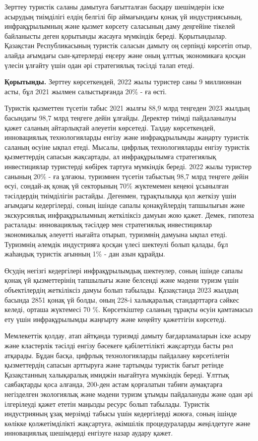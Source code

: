 \begin{multicols}{2}
Зерттеу туристік саланы дамытуға бағытталған басқару шешімдерін іске
асырудың тиімділігі елдің белгілі бір аймағындағы қонақ үй
индустриясының, инфрақұрылымның және қызмет көрсету саласының даму
деңгейіне тікелей байланысты деген қорытынды жасауға мүмкіндік береді.
Қорытындылар. Қазақстан Республикасының туристік саласын дамыту оң
серпінді көрсетіп отыр, алайда ағымдағы сын-қатерлерді еңсеру және оның
ұлттық экономикаға қосқан үлесін ұлғайту үшін одан әрі стратегиялық
тәсілді талап етеді.

{\bfseries Қорытынды.} Зерттеу көрсеткендей, 2022 жылы туристер саны 9
миллионнан асты, бұл 2021 жылмен салыстырғанда 20\% - ға өсті.

Туристік қызметтен түсетін табыс 2021 жылғы 88,9 млрд теңгеден 2023
жылдың басындағы 98,7 млрд теңгеге дейін ұлғайды. Деректер тиімді
пайдаланылуы қажет саланың айтарлықтай әлеуетін көрсетеді. Талдау
көрсеткендей, инновациялық технологияларды енгізу және инфрақұрылымды
жаңарту туристік саланың өсуіне ықпал етеді. Мысалы, цифрлық
технологияларды енгізу туристік қызметтердің сапасын жақсартады, ал
инфрақұрылымға стратегиялық инвестициялар туристерді көбірек тартуға
мүмкіндік береді. 2022 жылы туристер санының 20\% - ға ұлғаюы, туризмнен
түсетін табыстың 98,7 млрд теңгеге дейін өсуі, сондай-ақ қонақ үй
секторының 70\% жүктемемен кеңеюі ұсынылған тәсілдердің тиімділігін
растайды. Дегенмен, тұрақтылыққа қол жеткізу үшін ағымдағы кедергілерді,
соның ішінде сапалы қонақүйлердің тапшылығын және экскурсиялық
инфрақұрылымның жеткіліксіз дамуын жою қажет. Демек, гипотеза расталады:
инновациялық тәсілдер мен стратегиялық инвестициялар экономикалық
әлеуетті нығайта отырып, туризмнің дамуына ықпал етеді. Туризмнің
әлемдік индустрияға қосқан үлесі шектеулі болып қалады, бұл жаһандық
туристік ағынның 1\% - дан азын құрайды.

Өсудің негізгі кедергілері инфрақұрылымдық шектеулер, соның ішінде
сапалы қонақ үй қызметтерінің тапшылығы және белсенді және мәдени туризм
үшін объектілердің жеткіліксіз дамуы болып табылады. Қазақстанда 2023
жылдың басында 2851 қонақ үй болды, оның 228-і халықаралық стандарттарға
сәйкес келеді, орташа жүктемесі 70 \%. Көрсеткіштер саланың тұрақты
өсуін қамтамасыз ету үшін инфрақұрылымды жаңғырту және кеңейту
қажеттігін көрсетеді.

Мемлекеттік қолдау, атап айтқанда туризмді дамыту бағдарламаларын іске
асыру және кластерлік тәсілді енгізу бәсекеге қабілеттілікті жақсартуда
басты рөл атқарады. Бұдан басқа, цифрлық технологияларды пайдалану
көрсетілетін қызметтердің сапасын арттыруға және тартымды туристік бағыт
ретінде Қазақстанның халықаралық имиджін нығайтуға мүмкіндік береді.
Ұлттық саябақтарды қоса алғанда, 200-ден астам қорғалатын табиғи
аумақтарға негізделген экологиялық және мәдени туризм ұтымды пайдалануды
және одан әрі ілгерілеуді қажет ететін маңызды ресурс болып табылады.
Туристік индустрияның ұзақ мерзімді табысы үшін кедергілерді жоюға,
соның ішінде көлікке қолжетімділікті жақсартуға, әкімшілік
процедураларды жеңілдетуге және инновациялық шешімдерді енгізуге назар
аудару қажет.


\end{multicols}
